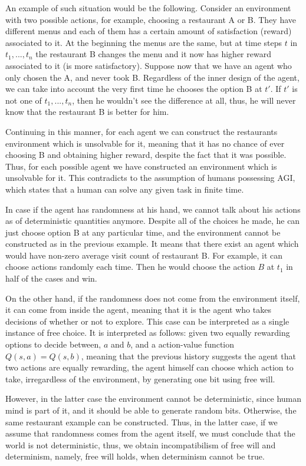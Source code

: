 \documentclass[a4paper]{article}
\begin{document}
An example of such situation would be the following. Consider an environment with two possible actions, for example, choosing a restaurant A or B. They have different menus and each of them has a certain amount of satisfaction (reward) associated to it. At the beginning the menus are the same, but at time steps $t$ in $t_1,...,t_n$ the restaurant B changes the menu and it now has higher reward associated to it (is more satisfactory). Suppose now that we have an agent who only chosen the A, and never took B. Regardless of the inner design of the agent, we can take into account the very first time he chooses the option B at $t'$. If $t'$ is not one of $t_1,...,t_n$, then he wouldn't see the difference at all, thus, he will never know that the restaurant B is better for him.

Continuing in this manner, for each agent we can construct the restaurants environment which is unsolvable for it, meaning that it has no chance of ever choosing B and obtaining higher reward, despite the fact that it was possible. Thus, for each possible agent we have constructed an environment which is unsolvable for it. This contradicts to the assumption of humans possessing AGI, which states that a human can solve any given task in finite time.

In case if the agent has randomness at his hand, we cannot talk about his actions as of deterministic quantities anymore. Despite all of the choices he made, he can just choose option B at any particular time, and the environment cannot be constructed as in the previous example. It means that there exist an agent which would have non-zero average visit count of restaurant B. For example, it can choose actions randomly each time. Then he would choose the action $B$ at $t_1$ in half of the cases and win.


On the other hand, if the randomness does not come from the environment itself, it can come from inside the agent, meaning that it is the agent who takes decisions of whether or not to explore. This case can be interpreted as a single instance of free choice. It is interpreted as follows: given two equally rewarding options to decide between, $a$ and $b$, and a action-value function \cite{sutton} $Q(s, a)=Q(s, b)$, meaning that the previous history suggests the agent that two actions are equally rewarding, the agent himself can choose which action to take, irregardless of the environment, by generating one bit using free will.

However, in the latter case the environment cannot be deterministic, since human mind is part of it, and it should be able to generate random bits. Otherwise, the same restaurant example can be constructed. Thus, in the latter case, if we assume that randomness comes from the agent itself, we must conclude that the world is not deterministic, thus, we obtain incompatibilism of free will and determinism, namely, free will holds, when determinism cannot be true.
\end{document}
